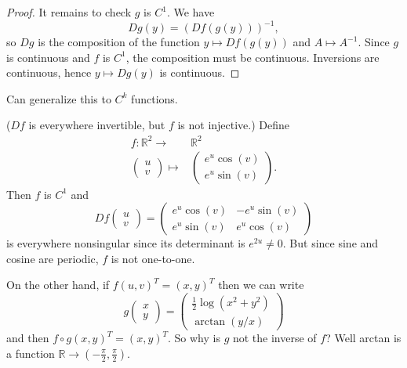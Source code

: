 \documentclass[12pt]{article}
\begin{document}
\begin{proof}
	It remains to check $g$ is $C^1$. We have 
	\begin{equation*}
		Dg(y) = (Df(g(y)))^{-1},
	\end{equation*}
	so $Dg$ is the composition of the function $y\mapsto Df(g(y))$ and $A\mapsto A^{-1}$. Since $g$ is continuous and $f$ is $C^1$, the composition must be continuous. Inversions are continuous, hence $y\mapsto Dg(y)$ is continuous.
\end{proof}	

\begin{remark}
	Can generalize this to $C^k$ functions.
\end{remark}

\begin{example}
	($Df$ is everywhere invertible, but $f$ is not injective.) Define 
	\begin{align*}
		f: \mathbb{R}^2 \to& \mathbb{R}^2 \\
		\begin{pmatrix}u \\ v\end{pmatrix} \mapsto& \begin{pmatrix}e^u\cos(v) \\ e^u\sin(v) \end{pmatrix}.
	\end{align*}
	Then $f$ is $C^1$ and 
	\begin{equation*}
		Df\begin{pmatrix} u \\ v\end{pmatrix} = \begin{pmatrix} e^u\cos(v) & -e^u\sin(v) \\ e^u\sin(v) & e^u\cos(v) \end{pmatrix}
	\end{equation*}
	is everywhere nonsingular since its determinant is $e^{2u}\neq 0$. But since sine and cosine are periodic, $f$ is not one-to-one.

	On the other hand, if $f(u,v)^T = (x,y)^T$ then we can write 
	\begin{equation*}
		g\begin{pmatrix} x \\ y\end{pmatrix} = \begin{pmatrix} \frac{1}{2}\log(x^2+y^2) \\ \arctan(y/x) \end{pmatrix}
	\end{equation*}
	and then $f\circ g(x,y)^T = (x,y)^T$. So why is $g$ not the inverse of $f$? Well arctan is a function $\mathbb{R}\to (-\frac{\pi}{2}, \frac{\pi}{2})$.


\end{example}
\end{document}
